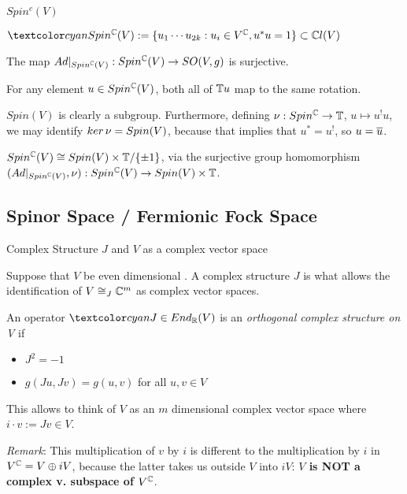 \begin{frame}{$Spin^c(V)$} %

    \begin{Definition} $\defn{\spincv} := \set{u_1 \cdots u_{2k}: u_i \in V^\CC, u^*u = 1} \subset \cclv$
    \end{Definition}
    
    
    \begin{proposition}
    The map $Ad|_{Spin^\mathbb C(V)}: Spin^\mathbb C(V) \to SO(V, g)$ is surjective.
    
    For any element $u \in Spin^\mathbb C(V)$, both all of $\mathbb T u$ map to the same rotation.
    \end{proposition}
    
    $Spin(V)$ is clearly a subgroup. Furthermore,  defining $\nu: Spin^\mathbb C \to \mathbb T$, $u \mapsto u^! u$, we may identify $ker\,\nu = Spin(V)$, because that implies that $u^*= u^!$, so $u = \overline{u}$.
    
    $Spin^\mathbb C(V) \cong Spin(V) \times \mathbb T / \{\pm 1\}$, via the surjective group homomorphism $(Ad|_{Spin^\mathbb C(V)}, \nu): Spin^\mathbb C(V) \to Spin(V) \times \mathbb T$.
    
\end{frame}

\subsection{Spinor Space / Fermionic Fock Space}

\begin{frame}{Complex Structure $J$ and $V$ as a complex vector space} %
    
    Suppose that $V$ be even dimensional%
    . A complex structure $J$ is what allows the identification of $V \cong_J \mathbb C^m$ as complex vector spaces.
    
    \begin{definition}
    An operator $\defn{J} \in End_\RR(V)$ is an \emph{orthogonal complex structure on V} if 
        
        \begin{itemize}
            
        \item $J^2 = -1$
        
        \item $g(Ju, Jv) = g(u, v)$ for all $u, v \in V$
            
        \end{itemize}
    \end{definition}
    
    This allows to think of $V$ as an $m$ dimensional complex vector space where $i \cdot v := Jv \in V$.
    
    \emph{Remark}: This multiplication of $v$ by $i$ is different to the multiplication by $i$ in $V^\mathbb C = V \oplus iV$, because the latter takes us outside $V$ into $iV$: \textbf{$V$ is NOT a complex v. subspace of $V^\mathbb C$}.

\end{frame}

